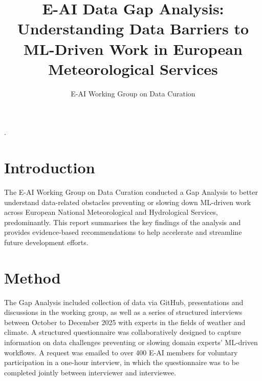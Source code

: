 \documentclass[acmtog,nonacm]{acmart}
\begin{document}
\title{E-AI Data Gap Analysis: Understanding Data Barriers to ML-Driven Work in European Meteorological Services}

\author{E-AI Working Group on Data Curation}
\begin{abstract}
\end{abstract}

\maketitle
.\
\section{Introduction}
The E-AI Working Group on Data Curation conducted a Gap Analysis to better understand data-related obstacles preventing or slowing down ML-driven work across European National Meteorological and Hydrological Services, predominantly. This report summarises the key findings of the analysis and provides evidence-based recommendations to help accelerate and streamline future development efforts.

\section{Method}
The Gap Analysis included collection of data via GitHub, presentations and discussions in the working group, as well as a series of structured interviews between October to December 2025 with experts in the fields of weather and climate. A structured questionnaire was collaboratively designed to capture information on data challenges preventing or slowing domain experts' ML-driven workflows. A request was emailed to over 400 E-AI members for voluntary participation in a one-hour interview, in which the questionnaire was to be completed jointly between interviewer and interviewee. 
\end{document}
